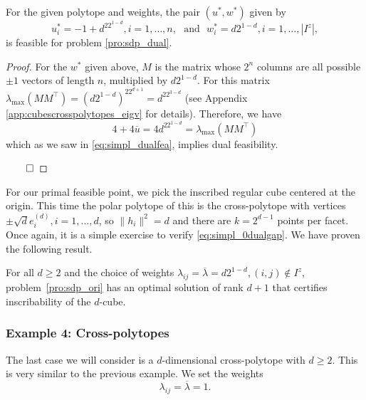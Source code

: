 \documentclass[smallextended, envcountsame]{svjour3}
\begin{document}
   \begin{lemma}\label{lem:cube}
        For the given polytope and weights, the pair $(u^*,w^*)$ given by
        \begin{equation*}
            u_i^*  = -1 + d^22^{1-d}, i=1,\ldots,n,~~~\text{and}~~~w_i^* = d2^{1-d}, i=1,\ldots,\left|I^z\right|,	
    	\end{equation*}
        is feasible for problem \eqref{pro:sdp_dual}.
    \end{lemma}
    \begin{proof}
        For the $w^*$ given above, $M$ is the matrix whose $2^n$ columns are all possible $\pm 1$ vectors of length $n$, multiplied by $d2^{1-d}$.  For this matrix $\lambda_{\max}(MM^\top)=\left(d2^{1-d}\right)^22^{d+1} = d^22^{3-d}$ (see Appendix \ref{app:cubescrosspolytopes_eigv} for details).  Therefore, we have $$4+4\overline{u}= 4d^22^{1-d} =  \lambda_{\max}(MM^\top)$$ which as we saw in \eqref{eq:simpl_dualfea}, implies dual feasibility.

    $\hfill\qed$
    \end{proof}

    For our primal feasible point, we pick the inscribed regular cube centered at the origin.  This time the polar polytope of this is the cross-polytope with vertices $\pm \sqrt{d} e_i^{(d)}, i=1,...,d$, so $\|h_i\|^2=d$ and there are $k=2^{d-1}$ points per facet.  Once again, it is a simple exercise to verify \eqref{eq:simpl_0dualgap}.  We have proven the following result.
    \begin{theorem}
        For all $d \ge 2$ and the choice of weights $\lambda_{ij} =  \overline{\lambda}= d2^{1-d}, (i,j)\notin I^z$, problem~\eqref{pro:sdp_ori} has an optimal solution of rank $d+1$ that certifies inscribability of the $d$-cube.
    \end{theorem}



\subsubsection{Example 4: Cross-polytopes}\label{subsubsec:crosspolytopes}
    The last case we will consider is a $d$-dimensional cross-polytope with $d\ge 2$. This is very similar to the previous example. We set the weights 
    \begin{equation*}
        \lambda_{ij} = \overline{\lambda}= 1.
    \end{equation*}
    
\end{document}

